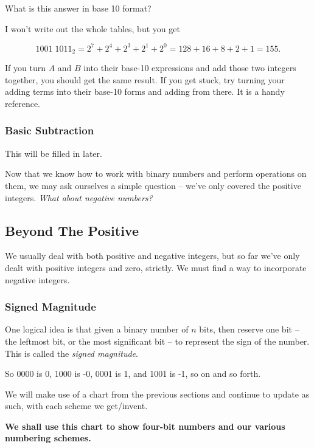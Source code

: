 \documentclass[12pt]{article}
\begin{document}
    What is this answer in base 10 format?

    I won't write out the whole tables, but
    you get

    \[1001 \; 1011_2 = 2^7 + 2^4 + 2^3 + 2^1 + 2^0 = 128 + 16 + 8 + 2 + 1 = 155. \]

    If you turn $A$ and $B$ into their base-10 expressions and add those two integers together,
    you should get the same result. If you get stuck, try turning your adding terms into
    their base-10 forms and adding from there. It is a handy reference.

    \subsubsection*{Basic Subtraction}
    This will be filled in later.



    Now that we know how to work with binary numbers and perform operations on them,
    we may ask ourselves a simple question -- we've only covered the positive integers. \textit{What about negative
    numbers?}



  \subsection*{Beyond The Positive}
  We usually deal with both positive and negative integers, but so far we've only dealt with positive integers
  and zero, strictly. We must find a way to incorporate negative integers.

  
  \subsubsection*{Signed Magnitude}
  
  One logical idea is that given a binary number of $n$ bits, then reserve one bit -- the leftmost bit,
  or the most significant bit -- to represent the sign
  of the number. This is called the \textit{signed magnitude}.

  So 0000 is 0, 1000 is -0, 0001 is 1, and 1001 is -1, so on and so forth.

  We will make use of a chart from the previous sections and continue to update as such, with
  each scheme we get/invent.

  \textbf{We shall use this chart to show four-bit numbers and our various numbering schemes.}
\end{document}
